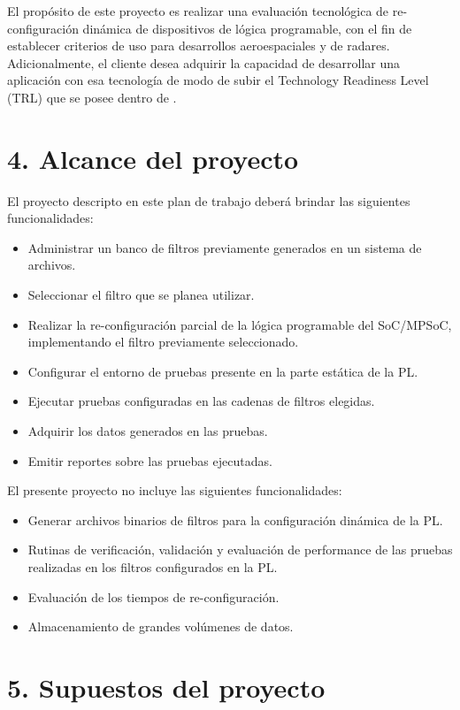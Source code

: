 \documentclass[
11pt, %
]{charter}
\begin{document}
El propósito de este proyecto es realizar una evaluación tecnológica de re-configuración dinámica de dispositivos de lógica programable, con el fin de establecer criterios de uso para desarrollos aeroespaciales y de radares. Adicionalmente, el cliente desea adquirir la capacidad de desarrollar una aplicación con esa tecnología de modo de subir el Technology Readiness Level (TRL) que se posee dentro de \empclientename.

\section{4. Alcance del proyecto}
\label{sec:alcance}

El proyecto descripto en este plan de trabajo deberá brindar las siguientes funcionalidades:

\begin{itemize}
	\item Administrar un banco de filtros previamente generados en un sistema de archivos.
	\item Seleccionar el filtro que se planea utilizar.
	\item Realizar la re-configuración parcial de la lógica programable del SoC/MPSoC, implementando el filtro previamente seleccionado.
	\item Configurar el entorno de pruebas presente en la parte estática de la PL.
	\item Ejecutar pruebas configuradas en las cadenas de filtros elegidas.
	\item Adquirir los datos generados en las pruebas.
	\item Emitir reportes sobre las pruebas ejecutadas.
\end{itemize}

El presente proyecto no incluye las siguientes funcionalidades:
\begin{itemize}
	\item Generar archivos binarios de filtros para la configuración dinámica de la PL.
	\item Rutinas de verificación, validación y evaluación de performance de las pruebas realizadas en los filtros configurados en la PL.
	\item Evaluación de los tiempos de re-configuración.
	\item Almacenamiento de grandes volúmenes de datos.
\end{itemize}

\section{5. Supuestos del proyecto}
\label{sec:supuestos}
\end{document}
